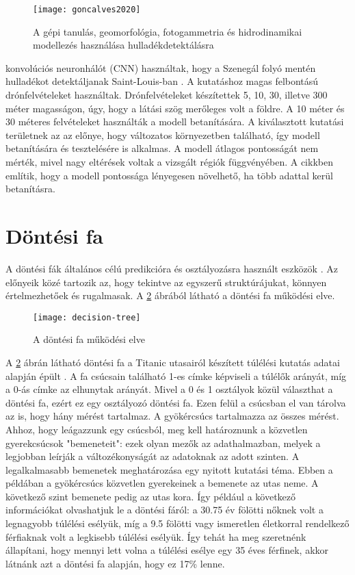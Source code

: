 \begin{figure}[H]
	\centering
	\texttt{[image: goncalves2020]}
	\caption{A gépi tanulás, geomorfológia, fotogammetria és hidrodinamikai modellezés használása hulladékdetektálásra \cite{Goncalves2020}}
    \label{fig:goncalves2020-method}
\end{figure}

\citeauthor{Youme2021} konvolúciós neuronhálót (CNN) használtak, hogy a Szenegál folyó mentén hulladékot detektáljanak Saint-Louis-ban \cite{Youme2021}. A kutatáshoz magas felbontású drónfelvételeket használtak. Drónfelvételeket készítettek 5, 10, 30, illetve 300 méter magasságon, úgy, hogy a látási szög merőleges volt a földre. A 10 méter és 30 méteres felvételeket használták a modell betanítására. A kiválasztott kutatási területnek az az előnye, hogy változatos környezetben található, így modell betanítására és tesztelésére is alkalmas. A modell átlagos pontosságát nem mérték, mivel nagy eltérések voltak a vizsgált régiók függvényében. A cikkben említik, hogy a modell pontossága lényegesen növelhető, ha több adattal kerül betanításra. 

\section{Döntési fa}
\label{ch:decision-tree}

A döntési fák általános célú predikcióra és osztályozásra használt eszközök \cite{deville2013}. Az előnyeik közé tartozik az, hogy tekintve az egyszerű struktúrájukat, könnyen értelmezhetőek és rugalmasak. A \ref{fig:decision-tree} ábrából látható a döntési fa működési elve.

\begin{figure}[H]
	\centering
	\texttt{[image: decision-tree]}
	\caption{A döntési fa működési elve \cite{deville2013}}
    \label{fig:decision-tree}
\end{figure}

A \ref{fig:decision-tree} ábrán látható döntési fa a Titanic utasairól készített túlélési kutatás adatai alapján épült \cite{Harrell2013}. A fa csúcsain található 1-es címke képviseli a túlélők arányát, míg a 0-ás címke az elhunytak arányát. Mivel a 0 és 1 osztályok közül választhat a döntési fa, ezért ez egy osztályozó döntési fa. Ezen felül a csúcsban el van tárolva az is, hogy hány mérést tartalmaz. A gyökércsúcs tartalmazza az összes mérést. Ahhoz, hogy leágazzunk egy csúcsból, meg kell határoznunk a közvetlen gyerekcsúcsok "bemeneteit": ezek olyan mezők az adathalmazban, melyek a legjobban leírják a változékonyságát az adatoknak az adott szinten. A legalkalmasabb bemenetek meghatározása egy nyitott kutatási téma. Ebben a példában a gyökércsúcs közvetlen gyerekeinek a bemenete az utas neme. A következő szint bemenete pedig az utas kora. Így például a következő információkat olvashatjuk le a döntési fáról: a 30.75 év fölötti nőknek volt a legnagyobb túlélési esélyük, míg a 9.5 fölötti vagy ismeretlen életkorral rendelkező férfiaknak volt a legkisebb túlélési esélyük. Így tehát ha meg szeretnénk állapítani, hogy mennyi lett volna a túlélési esélye egy 35 éves férfinek, akkor látnánk azt a döntési fa alapján, hogy ez 17\% lenne.

